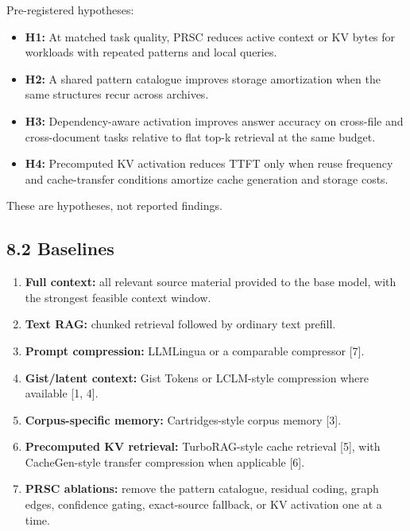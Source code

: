 \documentclass[
  10pt,
]{article}
\providecommand{\tightlist}{%
  \setlength{\itemsep}{0pt}\setlength{\parskip}{0pt}}
\begin{document}
Pre-registered hypotheses:

\begin{itemize}
\tightlist
\item
  \textbf{H1:} At matched task quality, PRSC reduces active context or
  KV bytes for workloads with repeated patterns and local queries.
\item
  \textbf{H2:} A shared pattern catalogue improves storage amortization
  when the same structures recur across archives.
\item
  \textbf{H3:} Dependency-aware activation improves answer accuracy on
  cross-file and cross-document tasks relative to flat top-k retrieval
  at the same budget.
\item
  \textbf{H4:} Precomputed KV activation reduces TTFT only when reuse
  frequency and cache-transfer conditions amortize cache generation and
  storage costs.
\end{itemize}

These are hypotheses, not reported findings.

\subsection{8.2 Baselines}\label{baselines}

\begin{enumerate}
\def\labelenumi{\arabic{enumi}.}
\tightlist
\item
  \textbf{Full context:} all relevant source material provided to the
  base model, with the strongest feasible context window.
\item
  \textbf{Text RAG:} chunked retrieval followed by ordinary text
  prefill.
\item
  \textbf{Prompt compression:} LLMLingua or a comparable compressor
  {[}7{]}.
\item
  \textbf{Gist/latent context:} Gist Tokens or LCLM-style compression
  where available {[}1, 4{]}.
\item
  \textbf{Corpus-specific memory:} Cartridges-style corpus memory
  {[}3{]}.
\item
  \textbf{Precomputed KV retrieval:} TurboRAG-style cache retrieval
  {[}5{]}, with CacheGen-style transfer compression when applicable
  {[}6{]}.
\item
  \textbf{PRSC ablations:} remove the pattern catalogue, residual
  coding, graph edges, confidence gating, exact-source fallback, or KV
  activation one at a time.
\end{enumerate}
\end{document}
